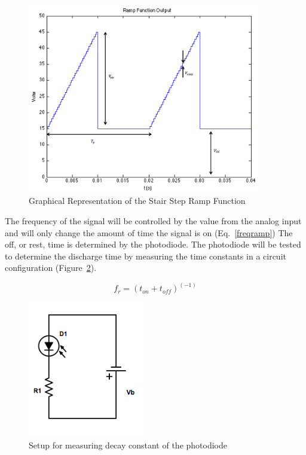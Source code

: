 \documentclass[12pt]{report}
\begin{document}
\begin{figure}[h!]
 \centering
 \includegraphics[width=4in]{stair_step_ramp_function.png}
 \caption[Ramp Function]{Graphical Representation of the Stair Step Ramp Function}
 \label{fig:rampfunc}
 \end{figure}

The frequency of the signal will be controlled by the value from the analog input and will only change the amount of time the signal is on (Eq.~\ref{freqramp}) The off, or rest, time is determined by the photodiode. The photodiode will be tested to determine the discharge time by measuring the time constants in a circuit configuration (Figure~\ref{fig:rctest}). 

\begin{equation}
f_r=(t_{on}+t_{off} )^{(-1)}
\label{freqramp}
\end{equation}

\begin{figure}[h!]
	\centering
	\includegraphics[width=2in]{diode_circuit.png}
	\caption[RC Diode Circuit]{Setup for measuring decay constant of the photodiode}
	\label{fig:rctest}
\end{figure}
  
\end{document}
